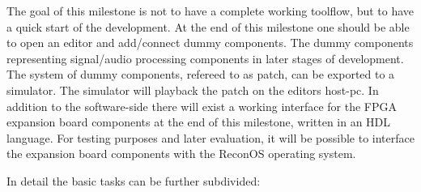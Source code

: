 The goal of this milestone is not to have a complete working toolflow, but to have a quick start of the development. At the end of this milestone one should be able to open an editor and add/connect dummy components. The dummy components representing signal/audio processing components in later stages of development. The system of dummy components, refereed to as patch, can be exported to a simulator. The simulator will playback the patch on the editors host-pc. 
In addition to the software-side there will exist a working interface for the \ac{FPGA} expansion board components at the end of this milestone, written in an HDL language. For testing purposes and later evaluation, it will be possible to interface the expansion board components with the ReconOS operating system.

In detail the basic tasks can be further subdivided:

